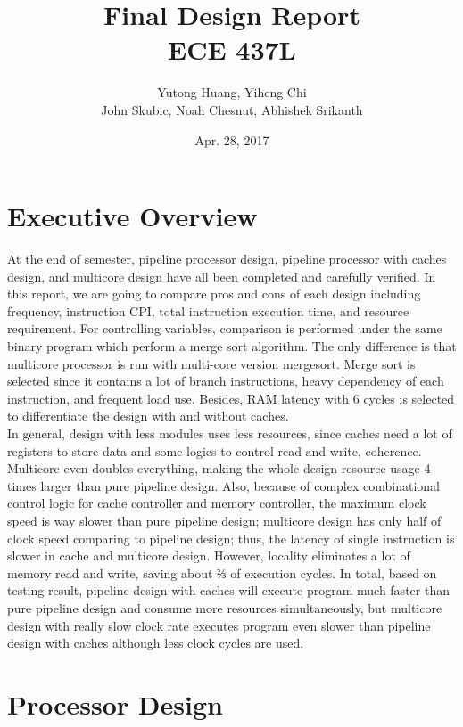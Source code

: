 \documentclass[12pt]{article}
\title{Final Design Report \\
	ECE 437L}
\author{Yutong Huang, Yiheng Chi \\
        John Skubic, Noah Chesnut, Abhishek Srikanth}
\date{Apr. 28, 2017}
\begin{document}
  \maketitle

  \newpage
  \section{Executive Overview}

  At the end of semester, pipeline processor design, pipeline processor with caches design, and multicore design have all been completed and carefully verified. In this report, we are going to compare pros and cons of each design including frequency, instruction CPI, total instruction execution time, and resource requirement. For controlling variables, comparison is performed under the same binary program which perform a merge sort algorithm. The only difference is that multicore processor is run with multi-core version mergesort. Merge sort is selected since it contains a lot of branch instructions, heavy dependency of each instruction, and frequent load use. Besides, RAM latency with 6 cycles is selected to differentiate the design with and without caches.\\
  In general, design with less modules uses less resources, since caches need a lot of registers to store data and some logics to control read and write, coherence. Multicore even doubles everything, making the whole design resource usage 4 times larger than pure pipeline design. Also, because of complex combinational control logic for cache controller and memory controller, the maximum clock speed is way slower than pure pipeline design; multicore design has only half of clock speed comparing to pipeline design; thus, the latency of single instruction is slower in cache and multicore design. However, locality eliminates a lot of memory read and write, saving about ⅔ of execution cycles. In total, based on testing result, pipeline design with caches will execute program much faster than pure pipeline design and consume more resources simultaneously, but multicore design with really slow clock rate executes program even slower than pipeline design with caches although less clock cycles are used.

  \newpage
  \section{Processor Design}
\end{document}

